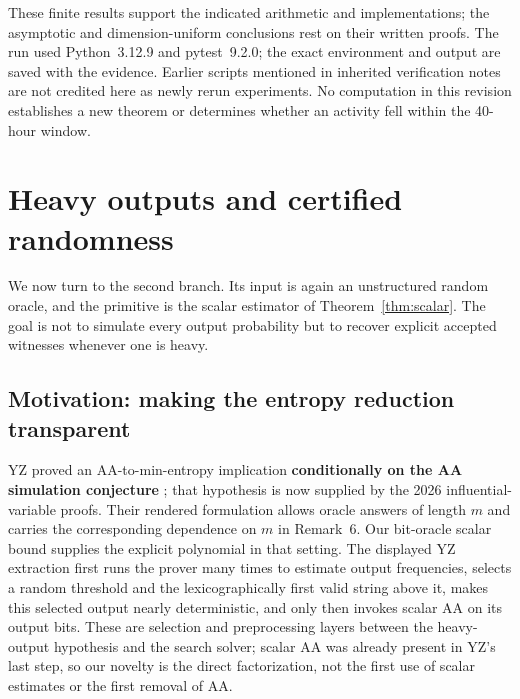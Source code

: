 \documentclass[11pt]{article}
\theoremstyle{definition}\newtheorem{definition}[theorem]{Definition}
\theoremstyle{remark}\newtheorem{remark}[theorem]{Remark}
\begin{document}
These finite results support the indicated arithmetic and implementations; the asymptotic and dimension-uniform conclusions rest on their written proofs. The run used Python~3.12.9 and pytest~9.2.0; the exact environment and output are saved with the evidence. Earlier scripts mentioned in inherited verification notes are not credited here as newly rerun experiments. No computation in this revision establishes a new theorem or determines whether an activity fell within the 40-hour window.

\section{Heavy outputs and certified randomness}\label{sec:certified}
We now turn to the second branch. Its input is again an unstructured random oracle, and the primitive is the scalar estimator of Theorem~\ref{thm:scalar}. The goal is not to simulate every output probability but to recover explicit accepted witnesses whenever one is heavy.

\subsection{Motivation: making the entropy reduction transparent}
YZ proved an AA-to-min-entropy implication \textbf{conditionally on the AA simulation conjecture} \cite[Conjecture~8.1 and Theorem~8.4]{YZ24}; that hypothesis is now supplied by the 2026 influential-variable proofs. Their rendered formulation allows oracle answers of length \(m\) and carries the corresponding dependence on \(m\) in Remark~6. Our bit-oracle scalar bound supplies the explicit polynomial in that setting. The displayed YZ extraction first runs the prover many times to estimate output frequencies, selects a random threshold and the lexicographically first valid string above it, makes this selected output nearly deterministic, and only then invokes scalar AA on its output bits. These are selection and preprocessing layers between the heavy-output hypothesis and the search solver; scalar AA was already present in YZ's last step, so our novelty is the direct factorization, not the first use of scalar estimates or the first removal of AA.
\end{document}
